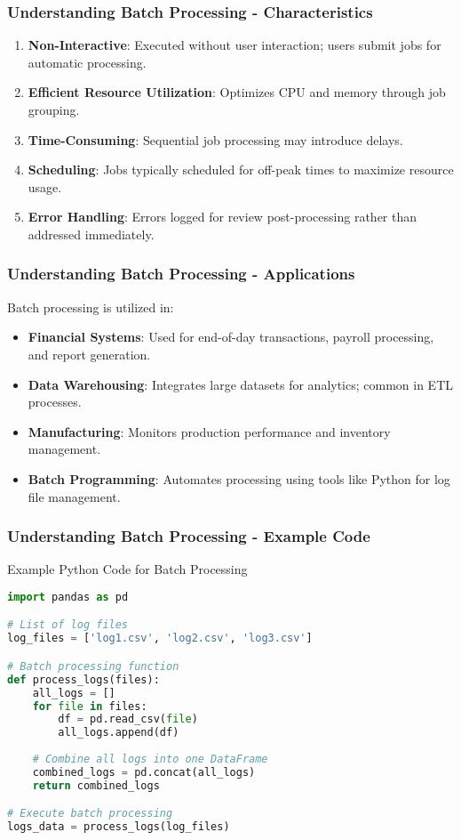 \documentclass{beamer}
\begin{document}
\begin{frame}[fragile]
    \frametitle{Understanding Batch Processing - Characteristics}
    \begin{enumerate}
        \item \textbf{Non-Interactive}: Executed without user interaction; users submit jobs for automatic processing.
        \item \textbf{Efficient Resource Utilization}: Optimizes CPU and memory through job grouping.
        \item \textbf{Time-Consuming}: Sequential job processing may introduce delays.
        \item \textbf{Scheduling}: Jobs typically scheduled for off-peak times to maximize resource usage.
        \item \textbf{Error Handling}: Errors logged for review post-processing rather than addressed immediately.
    \end{enumerate}
\end{frame}

\begin{frame}[fragile]
    \frametitle{Understanding Batch Processing - Applications}
    Batch processing is utilized in:
    \begin{itemize}
        \item \textbf{Financial Systems}: Used for end-of-day transactions, payroll processing, and report generation.
        \item \textbf{Data Warehousing}: Integrates large datasets for analytics; common in ETL processes.
        \item \textbf{Manufacturing}: Monitors production performance and inventory management.
        \item \textbf{Batch Programming}: Automates processing using tools like Python for log file management.
    \end{itemize}
\end{frame}

\begin{frame}[fragile]
    \frametitle{Understanding Batch Processing - Example Code}
    \begin{block}{Example Python Code for Batch Processing}
    \begin{lstlisting}[language=Python]
import pandas as pd

# List of log files
log_files = ['log1.csv', 'log2.csv', 'log3.csv']

# Batch processing function
def process_logs(files):
    all_logs = []
    for file in files:
        df = pd.read_csv(file)
        all_logs.append(df)
    
    # Combine all logs into one DataFrame
    combined_logs = pd.concat(all_logs)
    return combined_logs

# Execute batch processing
logs_data = process_logs(log_files)
    \end{lstlisting}
    \end{block}
\end{frame}
\end{document}
